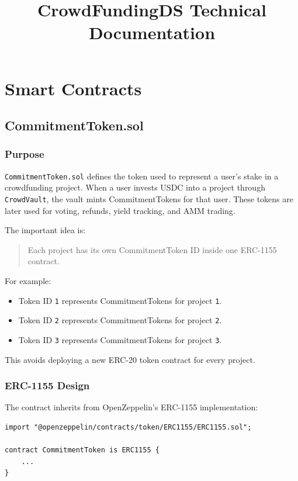\documentclass[11pt,a4paper]{article}
\title{CrowdFundingDS Technical Documentation}
\author{}
\date{}
\begin{document}
\maketitle
\tableofcontents
\newpage

\section{Smart Contracts}

\subsection{CommitmentToken.sol}

\subsubsection{Purpose}

\texttt{CommitmentToken.sol} defines the token used to represent a user's stake in a crowdfunding project. When a user invests USDC into a project through \texttt{CrowdVault}, the vault mints CommitmentTokens for that user. These tokens are later used for voting, refunds, yield tracking, and AMM trading.

The important idea is:

\begin{quote}
Each project has its own CommitmentToken ID inside one ERC-1155 contract.
\end{quote}

For example:

\begin{itemize}
  \item Token ID \texttt{1} represents CommitmentTokens for project \texttt{1}.
  \item Token ID \texttt{2} represents CommitmentTokens for project \texttt{2}.
  \item Token ID \texttt{3} represents CommitmentTokens for project \texttt{3}.
\end{itemize}

This avoids deploying a new ERC-20 token contract for every project.

\subsubsection{ERC-1155 Design}

The contract inherits from OpenZeppelin's ERC-1155 implementation:

\begin{lstlisting}
import "@openzeppelin/contracts/token/ERC1155/ERC1155.sol";

contract CommitmentToken is ERC1155 {
    ...
}
\end{lstlisting}
\end{document}

